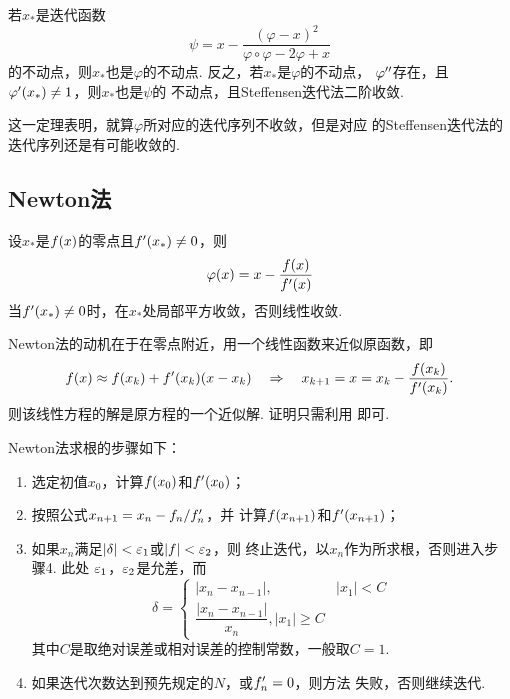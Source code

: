   \begin{thm}[Steffensen迭代法]
    若$x_*$是迭代函数
    \[
      \psi = x - \frac{(\varphi - x)^2}{\varphi\circ\varphi - 2\varphi + x}
    \]
    的不动点，则$x_*$也是$\varphi$的不动点. 反之，若$x_*$是$\varphi$的不动点，
    $\varphi^{\prime\prime}$存在，且$\varphi^\prime(x_*)\ne 1$，则$x_*$也是$\psi$的
    不动点，且Steffensen迭代法二阶收敛.
  \end{thm}
  \remark
    这一定理表明，就算$\varphi$所对应的迭代序列不收敛，但是对应
    的Steffensen迭代法的迭代序列还是有可能收敛的.

\subsection{Newton法}
  \begin{thm}[Newton法]
    设$x_*$是$\mathnormal{f}(x)$的零点且$\mathnormal{f}^\prime(x_*)\ne 0$，则
    \[
      \varphi(x) = x - \frac{\mathnormal{f}(x)}{\mathnormal{f}^\prime(x)}
    \]
    当$\mathnormal{f}^\prime(x_*)\ne 0$时，在$x_*$处局部平方收敛，否则线性收敛.
  \end{thm}
  \remark
    Newton法的动机在于在零点附近，用一个线性函数来近似原函数，即
    \[
      \mathnormal{f}(x) \approx \mathnormal{f}(x_k) + \mathnormal{f}^\prime(x_k)(x-x_k) \quad\Rightarrow\quad
      x_{k+1} = x = x_k - \frac{\mathnormal{f}(x_k)}{\mathnormal{f}^\prime(x_k)}.
    \]
    则该线性方程的解是原方程的一个近似解. 证明只需利用
    即可.

  \begin{alg}[Newton法]
    Newton法求根的步骤如下：
    \begin{enumerate}
      \item 选定初值$x_0$，计算$\mathnormal{f}(x_0)$和$\mathnormal{f}^\prime(x_0)$；
      \item 按照公式$x_{n+1} = x_n - \mathnormal{f}_n/\mathnormal{f}^\prime_n$，并
            计算$\mathnormal{f}(x_{n+1})$和$\mathnormal{f}^\prime(x_{n+1})$；
      \item 如果$x_n$满足$|\delta|<\varepsilon_1$或$|\mathnormal{f}|<\varepsilon_2$，则
        终止迭代，以$x_n$作为所求根，否则进入步骤4. 此处
        $\varepsilon_1$，$\varepsilon_2$是允差，而
        \[
          \delta =
          \begin{cases}
            |x_{n}-x_{n-1}|, & |x_1|<C \\
            \dfrac{|x_n-x_{n-1}|}{x_n}, |x_1|\ge C
          \end{cases}
        \]
        其中$C$是取绝对误差或相对误差的控制常数，一般取$C=1$.
      \item 如果迭代次数达到预先规定的$N$，或$\mathnormal{f}^\prime_n=0$，则方法
        失败，否则继续迭代.
    \end{enumerate}
  \end{alg}

